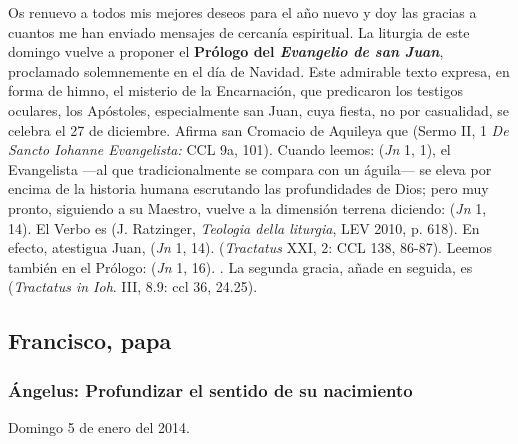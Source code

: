 \begin{body}
\begin{body}
Os renuevo a todos mis mejores deseos para el año nuevo y doy las gracias a cuantos me han enviado mensajes de cercanía espiritual. La liturgia de este domingo vuelve a proponer el \textbf{Prólogo del \emph{Evangelio de san Juan}}, proclamado solemnemente en el día de Navidad. Este admirable texto expresa, en forma de himno, el misterio de la Encarnación, que predicaron los testigos oculares, los Apóstoles, especialmente san Juan, cuya fiesta, no por casualidad, se celebra el 27 de diciembre. Afirma san Cromacio de Aquileya que  (Sermo II, 1 \emph{De Sancto Iohanne Evangelista:} CCL 9a, 101). Cuando leemos:  (\emph{Jn} 1, 1), el Evangelista ---al que tradicionalmente se compara con un águila--- se eleva por encima de la historia humana escrutando las profundidades de Dios; pero muy pronto, siguiendo a su Maestro, vuelve a la dimensión terrena diciendo:  (\emph{Jn} 1, 14). El Verbo es  (J. Ratzinger, \emph{Teologia della liturgia}, LEV 2010, p. 618). En efecto, atestigua Juan,  (\emph{Jn} 1, 14).  (\emph{Tractatus} XXI, 2: CCL 138, 86-87). Leemos también en el Prólogo:  (\emph{Jn} 1, 16). . La segunda gracia, añade en seguida, es  (\emph{Tractatus in Ioh}. III, 8.9: ccl 36, 24.25).

\subsection{Francisco, papa}

\subsubsection{Ángelus: Profundizar el sentido de su nacimiento}

Domingo 5 de enero del 2014.


\end{body}
\end{body}
